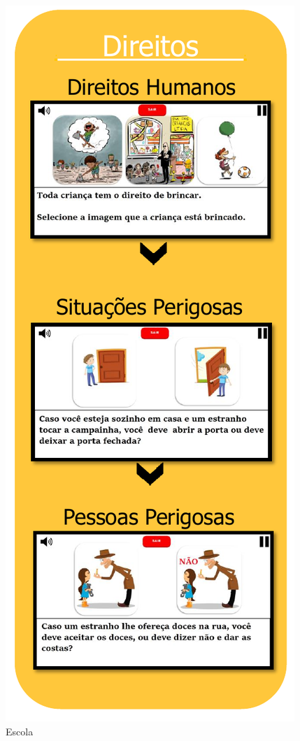 \begin{figure}%
  \vspace{-20pt}
  \caption{\label{fig:Escola}Escola}
  \includegraphics[width=\linewidth]{./Figuras/Escola.pdf}
  \vspace{-1.0cm}
\end{figure}

